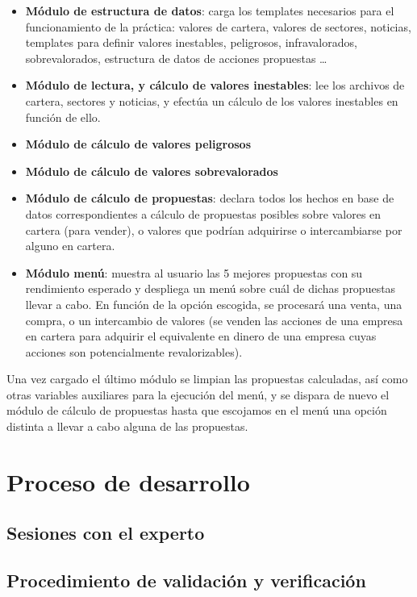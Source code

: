 \documentclass[a4paper,11pt]{article}
\begin{document}
\begin{itemize}
  \item \textbf{Módulo de estructura de datos}: carga los templates necesarios para el funcionamiento de la práctica: valores de cartera,
  valores de sectores, noticias, templates para definir valores inestables, peligrosos, infravalorados, sobrevalorados,
  estructura de datos de acciones propuestas \ldots

  \item \textbf{Módulo de lectura, y cálculo de valores inestables}: lee los archivos de cartera, sectores y noticias, y
  efectúa un cálculo de los valores inestables en función de ello.

  \item \textbf{Módulo de cálculo de valores peligrosos}
  
  \item \textbf{Módulo de cálculo de valores sobrevalorados}
  
  \item \textbf{Módulo de cálculo de propuestas}: declara todos los hechos en base de datos correspondientes a cálculo de
  propuestas posibles sobre valores en cartera (para vender), o valores que podrían adquirirse o intercambiarse por alguno en cartera.
  
  \item \textbf{Módulo menú}: muestra al usuario las 5 mejores propuestas con su rendimiento esperado y despliega un menú 
  sobre cuál de dichas propuestas llevar a cabo. En función de la opción escogida, se procesará una venta, una compra, o un
  intercambio de valores (se venden las acciones de una empresa en cartera para adquirir el equivalente en dinero de una
  empresa cuyas acciones son potencialmente revalorizables).
\end{itemize}

Una vez cargado el último módulo se limpian las propuestas calculadas, así como otras variables auxiliares para la ejecución
del menú, y se dispara de nuevo el módulo de cálculo de propuestas hasta que escojamos en el menú una opción distinta a
llevar a cabo alguna de las propuestas.

\section{Proceso de desarrollo}

\subsection{Sesiones con el experto}

\subsection{Procedimiento de validación y verificación}
\end{document}
